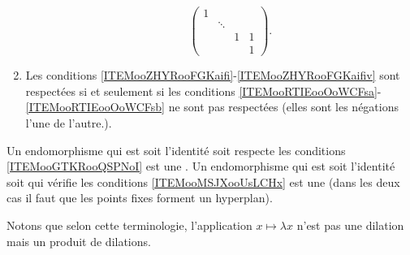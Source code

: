 \begin{theoremDef}
\begin{enumerate}
\begin{enumerate}
\begin{equation}
                        \begin{pmatrix}
                             1   &       &       &       \\
                                &   \ddots    &       &       \\
                                &       &   1    &   1    \\ 
                                &       &       &   1     
                         \end{pmatrix}.
                    \end{equation}
            \end{enumerate}
            \let\theenumii\oldtheenumii
        \item
            Les conditions \ref{ITEMooZHYRooFGKaifi}-\ref{ITEMooZHYRooFGKaifiv} sont respectées si et seulement si les conditions \ref{ITEMooRTIEooOoWCFsa}-\ref{ITEMooRTIEooOoWCFsb} ne sont pas respectées (elles sont les négations l'une de l'autre.).
    \end{enumerate}
    Un endomorphisme qui est soit l'identité soit respecte les conditions \ref{ITEMooGTKRooQSPNoI} est une . Un endomorphisme qui est soit l'identité soit qui vérifie les conditions \ref{ITEMooMSJXooUsLCHx} est une  (dans les deux cas il faut que les points fixes forment un hyperplan).
\end{theoremDef}

Notons que selon cette terminologie, l'application \( x\mapsto \lambda x\) n'est pas une dilation mais un produit de dilations.


